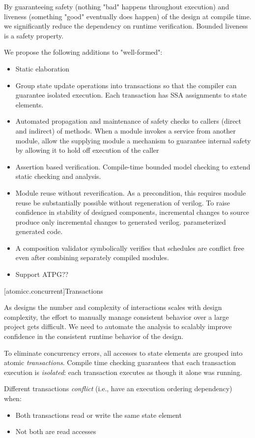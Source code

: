 By guaranteeing
safety (nothing "bad" happens throughout execution)
and liveness (something "good" eventually does happen) of the design at compile time.
we significantly reduce the dependency on runtime verification.
Bounded liveness is a safety property.

We propose the following additions to "well-formed":
\begin{itemize}
\item Static elaboration
\item Group state update operations into transactions so that the compiler can
guarantee isolated execution.  Each transaction has SSA assignments to state elements.
\item Automated propagation and maintenance of safety checks to callers (direct and
indirect) of methods.
When a module invokes a service from another module, allow the supplying
module a mechanism to guarantee internal safety by allowing it to
hold off execution of the caller
\item Assertion based verification.
Compile-time bounded model checking to extend static checking and analysis.  
\item Module reuse without reverification.  As a precondition,
this requires module reuse be substantially possible without regeneration of verilog.
To raise confidence in stability of designed components,
incremental changes to source produce only incremental changes to generated verilog.
parameterized generated code.
\item A composition validator symbolically verifies that schedules
are conflict free even after combining separately compiled modules.
\item Support ATPG??
\end{itemize}


[atomicc.concurrent]{Transactions}

As designs the number and complexity of interactions scales with design
complexity, the effort to manually manage consistent behavior over a large
project gets difficult.  
We need to automate the analysis to scalably improve confidence in the
consistent runtime behavior of the design.

To eliminate concurrency errors, all accesses to state elements are grouped into
atomic \textit{transactions}.
Compile time checking guarantees that
each transaction execution is \textit{isolated}: each transaction executes
as though it alone was running.

Different transactions \textit{conflict} (i.e., have an execution ordering dependency) when:
\begin{itemize}
\item Both transactions read or write the same state element
\item Not both are read accesses
\end{itemize}

